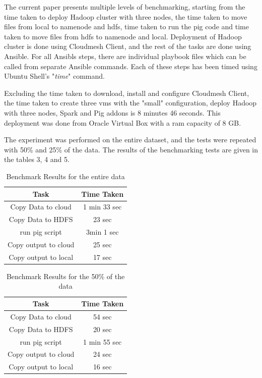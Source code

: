 \documentclass[9pt,twocolumn,twoside]{../../styles/osajnl}
\begin{document}
The current paper presents multiple levels of benchmarking, starting from the time taken to deploy Hadoop cluster with three nodes, the time taken to move files from local to namenode and hdfs, time taken to run the pig code and time taken to move files from hdfs to namenode and local. Deployment of Hadoop cluster is done using Cloudmesh Client, and the rest of the tasks are done using Ansible. For all Ansibls steps, there are individual playbook files which can be called from separate Ansible commands. Each of these steps has been timed using Ubuntu Shell's "\textit{time}" command. 

Excluding the time taken to download, install and configure Cloudmesh Client, the time taken to create three vms with the "small" configuration, deploy Hadoop with three nodes, Spark and Pig addons is 8 minutes 46 seconds. This deployment was done from Oracle Virtual Box with a ram capacity of 8 GB. 

The experiment was performed on the entire dataset, and the tests were repeated with 50\% and 25\% of the data. The results of the benchmarking tests are given in the tables 3, 4 and 5.

\begin{table}[h!]
\begin{tabular}{|c|c|}
\hline
\textbf{Task} & \textbf{Time Taken} \\ \hline
Copy Data to cloud & 1 min 33 sec  \\ \hline
Copy Data to HDFS & 23 sec  \\ \hline
run pig script & 3min 1 sec  \\ \hline
Copy output to cloud & 25 sec  \\ \hline
Copy output to local & 17 sec  \\ \hline
\end{tabular}
\caption{Benchmark Results for the entire data}
\end{table}

\begin{table}[h!]
\begin{tabular}{|c|c|}
\hline
\textbf{Task} & \textbf{Time Taken} \\ \hline
Copy Data to cloud & 54 sec  \\ \hline
Copy Data to HDFS & 20 sec  \\ \hline
run pig script & 1 min 55 sec  \\ \hline
Copy output to cloud & 24 sec  \\ \hline
Copy output to local & 16 sec  \\ \hline
\end{tabular}
\caption{Benchmark Results for the 50\% of the data}
\end{table}
\end{document}
